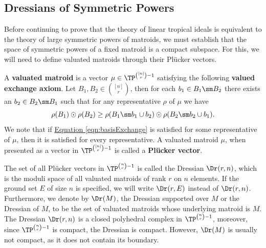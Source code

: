 \subsection{Dressians of Symmetric Powers}\label{subsec:SpacesofSymPow}
Before continuing to prove that the theory of linear tropical ideals is equivalent to the theory of large symmetric powers of matroids, we must establish that the space of symmetric powers of a fixed matroid is a compact subspace. For this, we will need to define valuated matroids through their Pl\"ucker vectors.

\begin{definition}\label{def:valuatedMatroid}
   A \textbf{valuated matroid} is a vector $\mu\in \TP^{\binom{[n]}{r}-1}$ satisfying the following \textbf{valued exchange axiom}. Let $B_1,B_2\in \binom{[n]}{r}$, then for each $b_1\in B_1\sm B_2$ there exists an $b_2\in B_2\sm B_1$ such that for any representative $\rho$ of $\mu$ we have
        \begin{equation}\label{eqn:basisExchange}
                \rho(B_1)\odot\rho(B_2)\geq \rho(B_1\sm b_1\cup b_2)\odot\rho(B_2\sm b_2\cup b_1).
        \end{equation}
    We note that if \hyperref[eqn:basisExchange]{Equation \ref*{eqn:basisExchange}} is satisfied for some representative of $\mu$, then it is satisfied for every representative. A valuated matroid $\mu$, when presented as a vector in $\TP^{\binom{[n]}{r}-1}$ is called a \textbf{Pl\"ucker vector}.
    \end{definition}
The set of all Pl\"ucker vectors in $\TP^{\binom{n}{r}-1}$ is called the Dressian $\Dr(r,n)$, which is the moduli space of all valuated matroids of rank $r$ on $n$ elements. If the ground set $E$ of size $n$ is specified, we will write $\Dr(r,E)$ instead of $\Dr(r,n)$. Furthermore, we denote by $\Dr(M)$, the Dressian supported over $M$ or the Dressian of $M$, to be the set of valuated matroids whose underlying matroid is $M$. The Dressian $\Dr(r,n)$ is a closed polyhedral complex in $\TP^{\binom{n}{r}-1}$, moreover, since $\TP^{\binom{n}{r}-1}$ is compact, the Dressian is compact. However, $\Dr(M)$ is usually not compact, as it does not contain its boundary.

